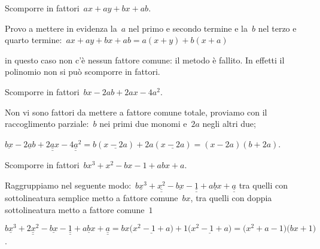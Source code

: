 \begin{exrig}
 \begin{esempio}
Scomporre in fattori~$ax+ay+bx+ab$.
  \begin{enumeratea}
  \item Provo a mettere in evidenza la~$a$ nel primo e secondo termine e 
   la~$b$ nel terzo e quarto termine:~$ax+ay+bx+ab=a(x+y)+b(x+a)$
  \item in questo caso non c'è nessun fattore comune: il metodo è fallito. 
   In effetti il polinomio non si può scomporre in fattori.
  \end{enumeratea}
 \end{esempio}

 \begin{esempio}
Scomporre in fattori~$bx-2ab+2ax-4a^{2}$.
 \begin{enumeratea}
 \item Non vi sono fattori da mettere a fattore comune totale, proviamo con 
  il raccoglimento parziale:~$b$ nei primi due monomi e~$2a$ negli altri due;
 \item $\underline{bx} -\underline{2ab}+\underline{\underline{2ax}}-
        \underline{\underline{4a^{2}}}=
        b(\underline{x-2a})+2a(\underline{x-2a})=(x-2a)(b+2a)$.
 \end{enumeratea}
 \end{esempio}

 \begin{esempio}
Scomporre in fattori~$bx^{3}+x^{2}-bx-1+abx+a$.
 \begin{enumeratea}
  \item Raggruppiamo nel seguente 
   modo:~$\underline{bx^{3}}+\underline{\underline {x^{2}}}-\underline{bx}-
          \underline{\underline{1}}+\underline{abx}+\underline{\underline{a}}$ 
   tra quelli con sottolineatura semplice metto a fattore comune~$bx$, 
   tra quelli con doppia sottolineatura metto a fattore comune~$1$
  \item
   $\underline{bx^{3}}+\underline{\underline {2x^{2}}}-\underline{bx}-
    \underline{\underline{1}}+\underline{abx}+\underline{\underline{a}}=
    bx\bigl(\underline{x^{2}-1+a}\bigr)+1\bigl(\underline{x^{2}-1+a}\bigr)=
    \bigl(x^{2}+a-1\bigr)\bigl(bx+1\bigr)$.
 \end{enumeratea}
 \end{esempio}


\end{exrig}
